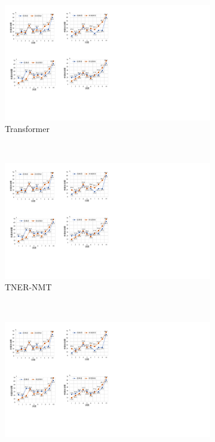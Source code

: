 
\begin{figure}[!htbp]
    \centering
    \begin{subfigure}[b]{0.5\textwidth}
      \includegraphics[width=\textwidth]{Img/fig_4_freq_acc_transformer.pdf}
      \caption{Transformer}
      \label{fig:4_freq_acc_transformer}
    \end{subfigure}%
    ~%
    \begin{subfigure}[b]{0.5\textwidth}
      \includegraphics[width=\textwidth]{Img/fig_4_freq_acc_tner.pdf}
      \caption{TNER-NMT}
      \label{fig:4_freq_acc_tner}
    \end{subfigure}
    \\%
    \begin{subfigure}[b]{0.5\textwidth}
      \includegraphics[width=\textwidth]{Img/fig_4_freq_acc_cer.pdf}

\end{subfigure}
\end{figure}
